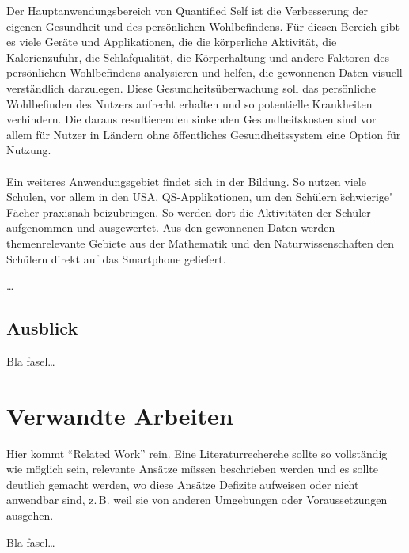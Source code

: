 Der Hauptanwendungsbereich von Quantified Self ist die Verbesserung der eigenen Gesundheit und des persönlichen Wohlbefindens. 
Für diesen Bereich gibt es viele Geräte und Applikationen, die die körperliche Aktivität, die Kalorienzufuhr, die Schlafqualität, die Körperhaltung und andere Faktoren des persönlichen Wohlbefindens analysieren und helfen, die gewonnenen Daten visuell verständlich darzulegen. 
Diese Gesundheitsüberwachung soll das persönliche Wohlbefinden des Nutzers aufrecht erhalten und so potentielle Krankheiten verhindern.
Die daraus resultierenden sinkenden Gesundheitskosten sind vor allem für Nutzer in Ländern ohne öffentliches Gesundheitssystem eine Option für Nutzung.
\\
\\
Ein weiteres Anwendungsgebiet findet sich in der Bildung. 
So nutzen viele Schulen, vor allem in den USA, QS-Applikationen, um den Schülern \"schwierige" Fächer praxisnah beizubringen. 
So werden dort die Aktivitäten der Schüler aufgenommen und ausgewertet.
Aus den gewonnenen Daten werden themenrelevante Gebiete aus der Mathematik und den Naturwissenschaften den Schülern direkt auf das Smartphone geliefert. 

\ldots 


\subsection{Ausblick}
\label{ch:Grundlagen:sec:Quantified Self:subsec:Ausblick}


Bla fasel\ldots





\section{Verwandte Arbeiten}
\label{ch:Grundlagen:sec:RelatedWork}
Hier kommt "`Related Work"' rein.
Eine Literaturrecherche sollte so vollständig wie möglich sein,
relevante Ansätze müssen beschrieben werden und es sollte deutlich 
gemacht werden, wo diese Ansätze Defizite aufweisen oder nicht
anwendbar sind, z.\,B. weil sie von anderen Umgebungen oder 
Voraussetzungen ausgehen.


Bla fasel\ldots


